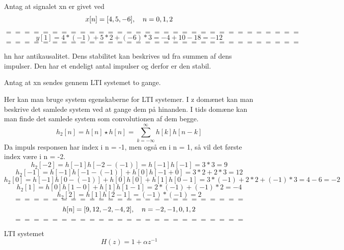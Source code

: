 \begin{EksamensOpgaver}
\begin{Eksamenssæt}
\begin{eksamensOpgave}
\begin{UnderOpgave}
            \end{UnderOpgave}
            Antag at signalet xn er givet ved 
            \[x[n] = [4, 5, -6], \tab{0} n = 0, 1, 2\]
            \begin{UnderOpgave}
                \[================================\]
                \[y[1] = 4 * (-1) + 5 * 2 + (-6) * 3 = -4 + 10 - 18 = -12\] 
                \[================================\]
            \end{UnderOpgave}
            \begin{UnderOpgave}
                hn har antikausalitet.
                Dens stabilitet kan beskrives ud fra summen af dens impulser. 
                Den har et endeligt antal impulser og derfor er den stabil.             
            \end{UnderOpgave}
            Antag at xn sendes gennem LTI systemet to gange. 
            \begin{UnderOpgave}
                Her kan man bruge system egenskaberne for LTI systemer. I z domænet kan man beskrive det samlede system ved at gange dem på hinanden. 
                I tids domæne kan man finde det samlede system som convolutionen af dem begge.
                \[h_2[n] = h[n]\star h[n] = \sum_{k = -\infty}^{\infty}{h[k]h[n - k]}\] 
                Da impuls responsen har index i n = -1, men også en i n = 1, så vil det første index være i n = -2. 
                \[h_2[-2] = h[-1]h[-2 - (-1)] = h[-1]h[-1] = 3*3 = 9\]
                \[h_2[-1] = h[-1]h[-1 - (-1)] + h[0]h[-1 + 0] = 3 * 2 + 2 * 3 = 12\]
                \[h_2[0] = h[-1]h[0 - (-1)] + h[0]h[0] + h[1]h[0 - 1] = 3 * (-1) + 2 * 2 + (-1) * 3 = 4 - 6 = -2\]
                \[h_2[1] = h[0]h[1 - 0] + h[1]h[1 - 1] = 2 * (-1) + (-1) * 2 = -4\]
                \[h_2[2] = h[1]h[2 - 1] = (-1) * (-1) = 2\]
                \[=========================\]
                \[h[n] = [9, 12, -2, -4, 2], \tab{0} n = -2, -1, 0, 1, 2\]
                \[=========================\]
            \end{UnderOpgave}
        \end{eksamensOpgave}
        \begin{eksamensOpgave}
            LTI systemet 
            \[H(z) = 1 + \alpha z^{-1}\]


\end{eksamensOpgave}
\end{Eksamenssæt}
\end{EksamensOpgaver}
